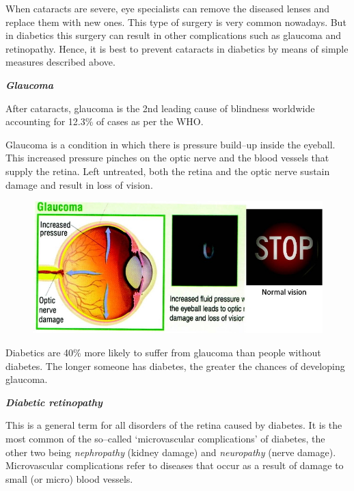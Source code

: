 {When cataracts are severe, eye specialists can remove the diseased lenses and replace them with new ones. This type of surgery is very common nowadays. But in diabetics this surgery can result in other complications such as glaucoma and retinopathy. Hence, it is best to prevent cataracts in diabetics by means of simple measures described above.

\textbf{\textit{Glaucoma}}

After cataracts, glaucoma is the 2nd leading cause of blindness worldwide accounting for 12.3\% of cases as per the WHO.

Glaucoma is a condition in which there is pressure build–up inside the eyeball. This increased pressure pinches on the optic nerve and the blood vessels that supply the retina. Left untreated, both the retina and the optic nerve sustain damage and result in loss of vision.

\begin{figure}
\includegraphics{images/051.jpg}
\end{figure}

Diabetics are 40\% more likely to suffer from glaucoma than people without diabetes. The longer someone has diabetes, the greater the chances of developing glaucoma.


\textbf{\textit{Diabetic retinopathy}}

This is a general term for all disorders of the retina caused by diabetes. It is the most common of the so–called ‘microvascular complications’ of diabetes, the other two being \textit{nephropathy} (kidney damage) and \textit{neuropathy} (nerve damage). Microvascular complications refer to diseases that occur as a result of damage to small (or micro) blood vessels.

}

